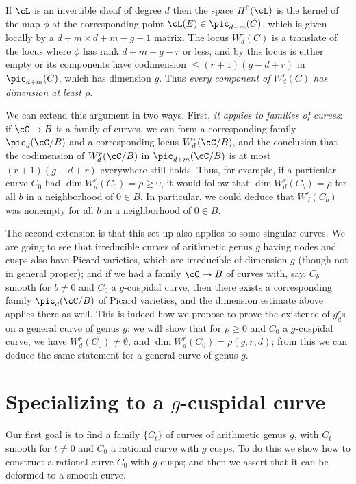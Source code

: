 If $\cL$ is an invertible sheaf of degree $d$ then the space $H^0(\cL)$ is the kernel of the map $\phi$ at the corresponding point $\cL(E) \in \pic_{d+m}(C)$, which is given locally by a $d+m \times d+m-g+1$ matrix. The locus $W^r_d(C)$ is a translate of the locus where $\phi$ has rank $d+m-g-r$ or less, and by \cite[Exercise 10.9]{Eisenbud1995} this locus is either empty or its components have codimension $\leq (r+1)(g-d+r)$ in $\pic_{d+m}(C)$, which has dimension $g$. Thus \emph{every component of $W^r_d(C)$ has dimension at least $\rho$}.

We can extend this argument in two ways. First, \emph{it applies to families of curves}: if $\cC \to B$ is a family of curves, we can form a corresponding family $\pic_d(\cC / B)$ and a corresponding locus $W^r_d(\cC / B)$, and the conclusion that the codimension of $W^r_d(\cC / B)$ in $\pic_{d+m}(\cC / B)$ is at most $(r+1)(g-d+r)$ everywhere still holds. Thus, for example, if a particular curve $C_0$ had $\dim W^r_d(C_0) = \rho \geq 0$, it would follow that $\dim W^r_d(C_b) = \rho$ for all $b$ in a neighborhood of $0 \in B$. In particular, we could deduce that $W^r_d(C_b)$ was nonempty for all $b$ in a neighborhood of $0 \in B$.


The second extension is that this set-up also applies  to some singular curves. We are going to see that irreducible curves of arithmetic genus $g$ having nodes and cusps also have Picard varieties, which are irreducible of dimension $g$ (though not in general proper); and if we had a family $\cC \to B$ of curves with, say, $C_b$ smooth for $b \neq 0$ and $C_0$ a $g$-cuspidal curve, then there exists a corresponding family $\pic_d(\cC/B)$ of Picard varieties, and the dimension estimate above applies there as well. This is indeed how we propose to prove the existence of $g^r_d$s on a general curve of genus $g$: we will show that for $\rho \geq 0$ and $C_0$ a $g$-cuspidal curve,  we have $W^r_d(C_0) \neq \emptyset$, and
 $\dim W^r_d(C_0) = \rho(g,r,d)$; from this we can deduce the same statement for a general curve of genus $g$.



\section{Specializing to a $g$-cuspidal curve}

Our first goal is to find a family $\{C_t\}$ of curves of arithmetic genus $g$, with $C_t$ smooth for $t \neq 0$ and $C_0$ a rational curve with $g$ cusps. To do this we show how to construct a rational curve $C_0$ with $g$ cusps; and then we assert that it can be deformed to a smooth curve.

